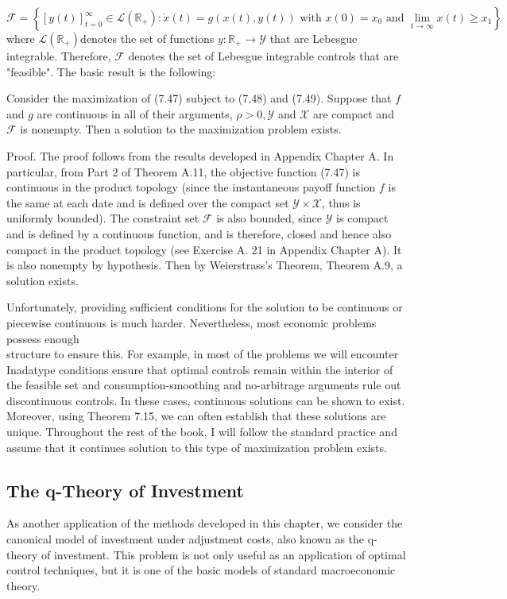 \documentclass[\topdir/lecture_notes.tex]{subfiles}
\begin{document}
\[
\mathcal{F}=\left\{[y(t)]_{t=0}^{\infty} \in \mathcal{L}\left(\mathbb{R}_{+}\right): \dot{x}(t)=g(x(t), y(t)) \text { with } x(0)=x_{0} \text { and } \lim _{t \rightarrow \infty} x(t) \geq x_{1}\right\}
\]
where $\mathcal{L}\left(\mathbb{R}_{+}\right)$denotes the set of functions $y: \mathbb{R}_{+} \rightarrow \mathcal{Y}$ that are Lebesgue integrable. Therefore, $\mathcal{F}$ denotes the set of Lebesgue integrable controls that are "feasible". The basic result is the following:

\begin{theorem}
Consider the maximization of (7.47) subject to (7.48) and (7.49). Suppose that $f$ and $g$ are continuous in all of their arguments, $\rho>0, \mathcal{Y}$ and $\mathcal{X}$ are compact and $\mathcal{F}$ is nonempty. Then a solution to the maximization problem exists.
\end{theorem}

Proof. The proof follows from the results developed in Appendix Chapter A. In particular, from Part 2 of Theorem A.11, the objective function (7.47) is continuous in the product topology (since the instantaneous payoff function $f$ is the same at each date and is defined over the compact set $\mathcal{Y} \times \mathcal{X}$, thus is uniformly bounded). The constraint set $\mathcal{F}$ is also bounded, since $\mathcal{Y}$ is compact and is defined by a continuous function, and is therefore, closed and hence also compact in the product topology (see Exercise A. 21 in Appendix Chapter A). It is also nonempty by hypothesis. Then by Weierstrass's Theorem, Theorem A.9, a solution exists.

Unfortunately, providing sufficient conditions for the solution to be continuous or piecewise continuous is much harder. Nevertheless, most economic problems possess enough\\
structure to ensure this. For example, in most of the problems we will encounter Inadatype conditions ensure that optimal controls remain within the interior of the feasible set and consumption-smoothing and no-arbitrage arguments rule out discontinuous controls. In these cases, continuous solutions can be shown to exist. Moreover, using Theorem 7.15, we can often establish that these solutions are unique. Throughout the rest of the book, I will follow the standard practice and assume that it continues solution to this type of maximization problem exists.

\subsection{The q-Theory of Investment}
As another application of the methods developed in this chapter, we consider the canonical model of investment under adjustment costs, also known as the q-theory of investment. This problem is not only useful as an application of optimal control techniques, but it is one of the basic models of standard macroeconomic theory.
\end{document}
